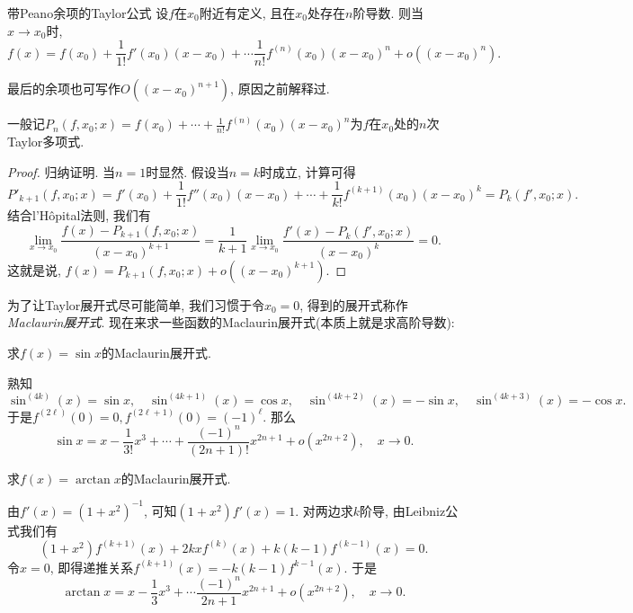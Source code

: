 \begin{theorem}{带Peano余项的Taylor公式}
	设$f$在$x_0$附近有定义, 且在$x_0$处存在$n$阶导数. 则当$x \to x_0$时, $$f(x)=f(x_0)+\frac{1}{1!}f'(x_0)(x-x_0) + \cdots \frac{1}{n!}f^{(n)}(x_0)(x-x_0)^n + o((x-x_0)^n). $$
\end{theorem}
\begin{remark}
	最后的余项也可写作$O((x-x_0)^{n+1})$, 原因之前解释过. 
\end{remark}
\begin{remark}
	一般记$P_n(f,x_0;x)=f(x_0) + \cdots + \frac{1}{n!}f^{(n)}(x_0)(x-x_0)^n$为$f$在$x_0$处的$n$次Taylor多项式. 
\end{remark}
\begin{proof}
	归纳证明. 当$n=1$时显然. 假设当$n=k$时成立, 计算可得$$P'_{k+1}(f,x_0;x) = f'(x_0)+\frac{1}{1!}f''(x_0)(x-x_0) + \cdots + \frac{1}{k!}f^{(k+1)}(x_0)(x-x_0)^k = P_k(f',x_0;x).$$
	结合l’Hôpital法则, 我们有$$\lim_{x \to x_0} \frac{f(x)-P_{k+1}(f,x_0;x)}{(x-x_0)^{k+1}} = \frac{1}{k+1} \lim_{x \to x_0} \frac{f'(x)-P_k(f',x_0;x)}{(x-x_0)^k}=0.$$
	这就是说, $f(x)=P_{k+1}(f,x_0;x)+o((x-x_0)^{k+1})$. 
\end{proof}

为了让Taylor展开式尽可能简单, 我们习惯于令$x_0=0$, 得到的展开式称作\textit{Maclaurin展开式}. 现在来求一些函数的Maclaurin展开式(本质上就是求高阶导数): 

\begin{example}
	求$f(x)=\sin x$的Maclaurin展开式. 
\end{example}
\begin{solution}
	熟知$$\sin ^{(4k)} (x) = \sin x,\quad \sin ^{(4k+1)} (x) = \cos x,\quad \sin ^{(4k+2)} (x) = -\sin x,\quad \sin ^{(4k+3)} (x) = -\cos x. $$
	于是$f^{(2\ell )}(0)=0,f^{(2\ell +1)}(0)=(-1)^{\ell}$. 那么$$\sin x = x-\frac{1}{3!} x^3 + \cdots + \frac{(-1)^n}{(2n+1)!}x^{2n+1} + o(x^{2n+2}),\quad x\to 0.$$
\end{solution}

\begin{example}
	求$f(x)=\arctan x$的Maclaurin展开式. 
\end{example}
\begin{solution}
	由$f'(x)=(1+x^2)^{-1}$, 可知$(1+x^2)f'(x)=1$. 对两边求$k$阶导, 由Leibniz公式我们有$$(1+x^2)f^{(k+1)}(x) + 2kxf^{(k)}(x) + k(k-1)f^{(k-1)}(x)=0. $$
	令$x=0$, 即得递推关系$f^{(k+1)}(x)=-k(k-1)f^{k-1}(x)$. 于是$$\arctan x = x-\frac{1}{3}x^3+\cdots \frac{(-1)^n}{2n+1}x^{2n+1} + o(x^{2n+2}),\quad x\to 0. $$
\end{solution}

